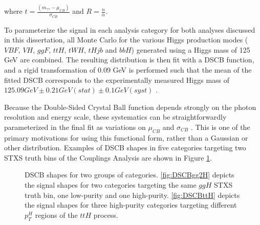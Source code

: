 where $t = \frac{(m_{\gamma \gamma} - \mu_{CB})}{\sigma_{CB}}$ and $R = \frac{n}{\alpha}$. 

To parameterize the signal in each analysis category for both analyses discussed in this dissertation, all Monte Carlo for the various Higgs production modes ($VBF$, $VH$, $ggF$, $ttH$, $tWH$, $tHjb$ and $bbH$) generated using a Higgs mass of 125 GeV are combined. The resulting distribution is then fit with a DSCB function, and a rigid transformation of 0.09 GeV is performed such that the mean of the fitted DSCB corresponds to the experimentally measured Higgs mass of $125.09 GeV \pm 0.21 GeV(stat) \pm 0.1 GeV(syst)$ \cite{Higgsmass}.

Because the Double-Sided Crystal Ball function depends strongly on the photon resolution and energy scale, these systematics can be straightforwardly parameterized in the final fit as variations on $\mu_{CB}$ and $\sigma_{CB}$ \cite{gammaID}. This is one of the primary motivations for using this functional form, rather than a Gaussian or other distribution. Examples of DSCB shapes in five categories targeting two STXS truth bins of the Couplings Analysis are shown in Figure \ref{fig:DSCB}.

\begin{figure}[h]
\centering
{}
\caption{DSCB shapes for two groups of categories. \ref{fig:DSCBgg2H} depicts the signal shapes for two categories targeting the same $ggH$ STXS truth bin, one low-purity and one high-purity. \ref{fig:DSCBttH} depicts the signal shapes for three high-purity categories targeting different $p_{T}^{H}$ regions of the $ttH$ process.}
\label{fig:DSCB}
\end{figure}

